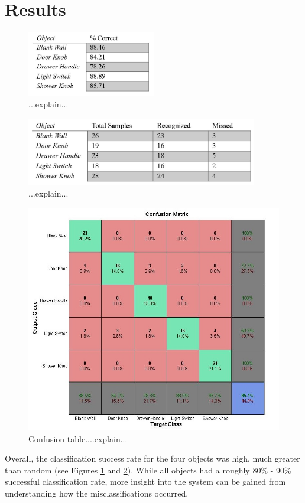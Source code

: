 \documentclass{article}
\begin{document}
\section{Results}
\begin{figure}[h!]
    \centering
    \includegraphics[width=0.5\textwidth]{Results_1.JPG}
    \caption{...explain...}
    \label{fig:results1}
\end{figure}
\begin{figure}[h!]
    \centering
    \includegraphics[width=0.9\textwidth]{Results_2.JPG}
    \caption{...explain...}
    \label{fig:results2}
\end{figure}
\begin{figure}[h!]
    \centering
    \includegraphics[width=.6\textwidth]{confusion.jpg}
    \caption{Confusion table....explain...}
    \label{fig:confusion}
\end{figure}

Overall, the classification success rate for the four objects was high, much greater than random (see Figures \ref{fig:results1} and \ref{fig:results2}). While all objects had a roughly 80\% - 90\% successful classification rate, more insight into the system can be gained from understanding how the misclassifications occurred.
\end{document}

